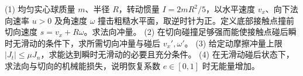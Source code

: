 (1) 均匀实心球质量 \(m\)、半径 \(R\)，转动惯量 \(I=2mR^2/5\)，以水平速度 \(v_x\)、向下法向速率 \(u>0\) 及角速度 \(\omega\) 撞击粗糙水平面，取逆时针为正。定义底部接触点撞前切向速度 \(s=v_x+R\omega\)。求法向冲量。
(2) 在切向碰撞足够强而能使接触点碰后瞬时无滑动的条件下，求所需切向冲量与碰后 \(v_x',\omega'\)。
(3) 给定动摩擦冲量上限 \(|J_t|\le\mu J_n\)，求能达到瞬时无滑动的必要且充分条件。
(4) 在无滑动碰后状态下，求法向与切向的机械能损失，说明恢复系数 \(e\in[0,1]\) 时无能量增加。
